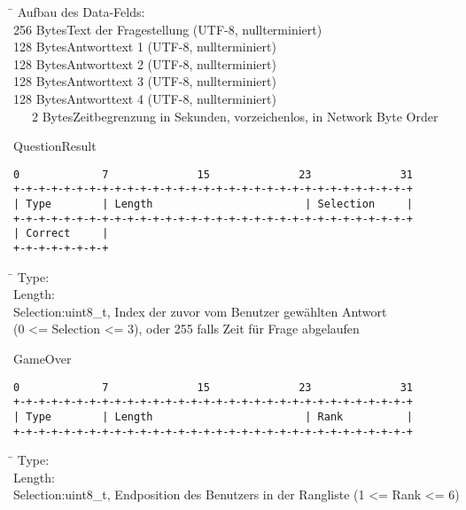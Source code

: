\documentclass[a4paper,10pt]{article}
\begin{document}
\begin{tabbing}
\hspace{2 cm}\=\kill
Aufbau des Data-Felds:\\
256 Bytes\>Text der Fragestellung (UTF-8, nullterminiert)\\
128 Bytes\>Antworttext 1 (UTF-8, nullterminiert)\\
128 Bytes\>Antworttext 2 (UTF-8, nullterminiert)\\
128 Bytes\>Antworttext 3 (UTF-8, nullterminiert)\\
128 Bytes\>Antworttext 4 (UTF-8, nullterminiert)\\
\ \  \ 2 Bytes\>Zeitbegrenzung in Sekunden, vorzeichenlos, in Network Byte Order
\end{tabbing}


$~~$\\QuestionResult

\begin{Verbatim}[fontfamily=courier]
 0             7              15              23              31
+-+-+-+-+-+-+-+-+-+-+-+-+-+-+-+-+-+-+-+-+-+-+-+-+-+-+-+-+-+-+-+
| Type        | Length                        | Selection     |
+-+-+-+-+-+-+-+-+-+-+-+-+-+-+-+-+-+-+-+-+-+-+-+-+-+-+-+-+-+-+-+
| Correct     |
+-+-+-+-+-+-+-+
\end{Verbatim}

\begin{tabbing}
\hspace{2 cm}\=\kill
Type:\\
Length:\\
Selection:\>uint8\_t, Index der zuvor vom Benutzer gewählten Antwort\\
\>(0 <= Selection <= 3), oder 255 falls Zeit für Frage abgelaufen
\end{tabbing}

$~~$\\GameOver

\begin{Verbatim}[fontfamily=courier]
 0             7              15              23              31
+-+-+-+-+-+-+-+-+-+-+-+-+-+-+-+-+-+-+-+-+-+-+-+-+-+-+-+-+-+-+-+
| Type        | Length                        | Rank          |
+-+-+-+-+-+-+-+-+-+-+-+-+-+-+-+-+-+-+-+-+-+-+-+-+-+-+-+-+-+-+-+
\end{Verbatim}

\begin{tabbing}
\hspace{2 cm}\=\kill
Type:\\
Length:\\
Selection:\>uint8\_t, Endposition des Benutzers in der Rangliste (1 <= Rank <= 6)\\
\end{tabbing}
\end{document}
